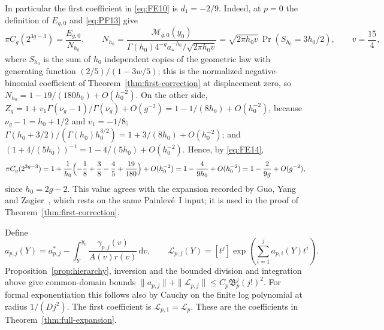 In particular the first coefficient in \eqref{eq:FE10} is $d_1=-2/9$.
Indeed, at $p=0$ the definition of $E_{g,0}$ and \eqref{eq:PF13} give
\[
 \pi C_g(2^{3g-3})=\frac{E_{g,0}}{N_{h_0}},\qquad
 N_{h_0}=\frac{\mathcal M_{g,0}(y_0)}
          {\Gamma(h_0)4^{-g}a_*^{-h_0}/\sqrt{2\pi h_0v}}
     =\sqrt{2\pi h_0v}\,\Pr(S_{h_0}=3h_0/2),\qquad v=\frac{15}4,
\]
where $S_{h_0}$ is the sum of $h_0$ independent copies of the geometric law
with generating function $(2/5)/(1-3w/5)$; this is the normalized
negative-binomial coefficient of Theorem~\ref{thm:first-correction} at
displacement zero, so $N_{h_0}=1-19/(180h_0)+O(h_0^{-2})$. On the other side,
$Z_g=1+v_1\Gamma(\nu_g-1)/\Gamma(\nu_g)+O(g^{-2})=1-1/(8h_0)+O(h_0^{-2})$,
because $\nu_g-1=h_0+1/2$ and $v_1=-1/8$;
$\Gamma(h_0+3/2)/(\Gamma(h_0)h_0^{3/2})=1+3/(8h_0)+O(h_0^{-2})$; and
$(1+4/(5h_0))^{-1}=1-4/(5h_0)+O(h_0^{-2})$. Hence, by \eqref{eq:FE14},
\[
 \pi C_g(2^{3g-3})
 =1+\frac1{h_0}\Bigl(-\frac18+\frac38-\frac45+\frac{19}{180}\Bigr)+O(h_0^{-2})
 =1-\frac4{9h_0}+O(h_0^{-2})
 =1-\frac2{9g}+O(g^{-2}),
\]
since $h_0=2g-2$. This value agrees with the expansion recorded by Guo,
Yang and Zagier~\cite[equation~(25)]{GYZ}, which rests on the same
Painlev\'e~I input; it is used in the proof of
Theorem~\ref{thm:first-correction}.

Define
\begin{equation}
 a_{p,j}(Y)=a^*_{p,j}-\int_Y^{y_0}\frac{\gamma_{p,j}(v)}{A(v)r(v)}\,\mathrm{d}v,
 \qquad
 \mathcal L_{p,j}(Y)=[t^j]\exp\!\left(\sum_{i=1}^j a_{p,i}(Y)t^i\right).
 \label{eq:FE11}
\end{equation}
Proposition~\ref{prop:hierarchy}, inversion and the bounded division
and integration above give common-domain bounds
$\|a_{p,j}\|+\|\mathcal L_{p,j}\|\le C_p\mathfrak B_p^j(j!)^2$.
For formal exponentiation this follows also by Cauchy on the finite
log polynomial at radius $1/(Dj^2)$. The first coefficient is
$\mathcal L_{p,1}=\mathcal L_p$. These are the coefficients in
Theorem~\ref{thm:full-expansion}.

